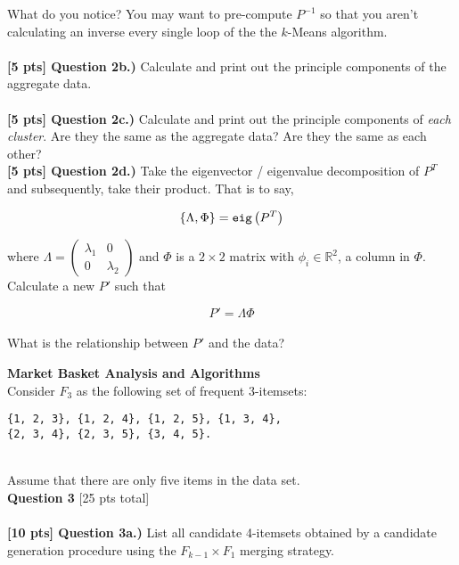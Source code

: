 \documentclass[paper=a4, fontsize=11pt]{scrartcl} %
\begin{document}
What do you notice? You may want to pre-compute $P^{-1}$ so that you aren't calculating an inverse every single loop of the the $k$-Means algorithm. \\
\\
\textbf{[5 pts] Question 2b.)}
Calculate and print out the principle components of the aggregate data. \\
\\
\textbf{[5 pts] Question 2c.)}
Calculate and print out the principle components of \emph{each cluster}. Are they the same as the aggregate data? Are they the same as each other?\\

\textbf{[5 pts] Question 2d.)}
Take the eigenvector / eigenvalue decomposition of $P^T$ and subsequently, take their product. That is to say, 

\begin{equation}
    \{\Lambda, \Phi\} = \verb"eig"\left( P^T \right)
    \nonumber
\end{equation}

where $\Lambda = \left( \begin{matrix} \lambda_1 & 0 \\ 0 & \lambda_2 \end{matrix} \right)$ and $\Phi$ is a $2 \times 2$ matrix with $\phi_i \in \mathbb{R}^2$, a column in $\Phi$. Calculate a new $P'$ such that

\begin{equation}
    P' = \Lambda \Phi \nonumber
\end{equation}
\\
What is the relationship between $P'$ and the data? 

\vspace{10mm}

{\huge \textbf{Market Basket Analysis and Algorithms}} \\

Consider $F_3$ as the following set of frequent 3-itemsets:

\begin{verbatim}
{1, 2, 3}, {1, 2, 4}, {1, 2, 5}, {1, 3, 4}, 
{2, 3, 4}, {2, 3, 5}, {3, 4, 5}.
\end{verbatim} \\

Assume that there are only five items in the data set. \\

{\Large \textbf{Question 3} [25 pts total]} \\
\\
\textbf{[10 pts] Question 3a.)} List all candidate 4-itemsets obtained by a candidate generation procedure using the $F_{k - 1} \times F_1$ merging strategy. \\
\\
\end{document}
